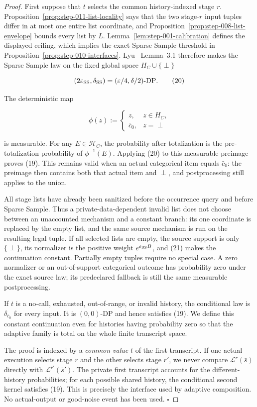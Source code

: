 \begin{proof}
First suppose that \(t\) selects the common history-indexed stage
\(r\). Proposition~\ref{prop:step-011-list-locality} says that the two
stage-\(r\) input tuples differ in at most one entire list coordinate, and
Proposition~\ref{prop:step-008-list-envelope} bounds every list by \(L\).
Lemma~\ref{lem:step-001-calibration} defines the displayed ceiling, which
implies the exact Sparse Sample threshold in
Proposition~\ref{prop:step-010-interfaces}. Lyu~\citep{lyu2025} Lemma~3.1
therefore makes the Sparse Sample law
on the fixed global space \(H_C\cup\{\perp\}\)

\[
 (2\varepsilon_{\rm SS},\delta_{\rm SS})
 =(\varepsilon/4,\delta/2)\text{-DP}.
\tag{20}
\]

The deterministic map

\[
 \phi(z):=
 \begin{cases}
 z,&z\in H_C,\\
 \bar c_0,&z=\perp
 \end{cases}
\tag{21}
\]

is measurable. For any \(E\in\mathcal H_C\), the probability after
totalization is the pre-totalization probability of
\(\phi^{-1}(E)\). Applying (20) to this measurable preimage proves (19).
This remains valid when an actual categorical item equals \(\bar c_0\):
the preimage then contains both that actual item and \(\perp\), and
postprocessing still applies to the union.

All stage lists have already been sanitized before the occurrence query and
before Sparse Sample. Thus a private-data-dependent invalid list does not
choose between an unaccounted mechanism and a constant branch: its one
coordinate is replaced by the empty list, and the same source mechanism is
run on the resulting legal tuple. If all selected lists are empty, the
source support is only \(\{\perp\}\), its normalizer is the positive weight
\(e^{\varepsilon_{\rm SS}B}\), and (21) makes the continuation constant.
Partially empty tuples require no special case. A zero normalizer or an
out-of-support categorical outcome has probability zero under the exact
source law; its predeclared fallback is still the same measurable
postprocessing.

If \(t\) is a no-call, exhausted, out-of-range, or invalid history, the
conditional law is \(\delta_{\bar c_0}\) for every input. It is
\((0,0)\)-DP and hence satisfies (19). We define this constant continuation
even for histories having probability zero so that the adaptive family is
total on the whole finite transcript space.

The proof is indexed by a \emph{common value} \(t\) of the first transcript. If
one actual execution selects stage \(r\) and the other selects stage \(r'\),
we never compare \(\mathcal L^r(\bar s)\) directly with
\(\mathcal L^{r'}(\bar s')\). The private first transcript accounts for the
different-history probabilities; for each possible shared history, the
conditional second kernel satisfies (19). This is precisely the interface
used by adaptive composition. No actual-output or good-noise event has been
used. \(\square\)


\end{proof}

